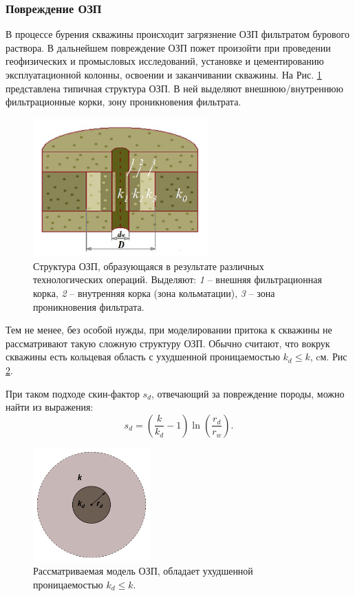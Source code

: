 \subsubsection{Повреждение ОЗП}
	В процессе бурения скважины происходит загрязнение ОЗП фильтратом бурового раствора.
	В дальнейшем повреждение ОЗП пожет произойти при проведении геофизических и промысловых исследований, установке и цементированию эксплуатационной колонны, освоении и заканчивании скважины. На Рис. \ref{pic:near_wellbore} представлена типичная структура ОЗП. В ней выделяют внешнюю/внутреннюю фильтрационные корки, зону проникновения фильтрата.
\begin{figure}[H]
	\label{pic:near_wellbore}
	\centerline{\includegraphics[width=0.6\textwidth]{pic/near-wellbore.png}}
	\caption{Структура ОЗП, образующаяся в результате различных технологических операций. Выделяют:
	\textit{1} -- внешняя фильтрационная корка,
	\textit{2} -- внутренняя корка (зона кольматации), 
	\textit{3} -- зона проникновения фильтрата.}
\end{figure}

	Тем не менее, без особой нужды, при моделировании притока к скважины не рассматривают такую сложную структуру ОЗП. Обычно считают, что вокрук скважины есть кольцевая область с ухудшенной проницаемостью $k_d \leq k$, cм. Рис \ref{pic:near_wellbore_our}.

	При таком подходе скин-фактор $s_d$, отвечающий за повреждение породы, можно найти из выражения:
\begin{equation}
	\label{skin_damage}
	s_d = \left(\frac{k}{k_d}-1\right)\ln\left(\frac{r_d}{r_w}\right).
\end{equation}

\begin{figure}[H]
	\label{pic:near_wellbore_our}
	\centerline{\includegraphics[width=0.4\textwidth]{pic/near-wellbore-our.png}}
	\caption{Рассматриваемая модель ОЗП, обладает ухудшенной проницаемостью $k_d \leq k$.}
\end{figure}

